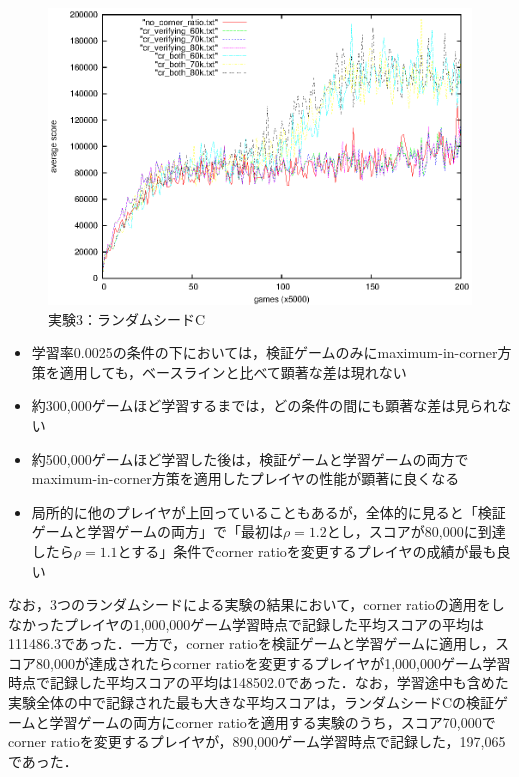 \documentclass{suribt}
\begin{document}
\begin{figure}[tb]
	\begin{center}
	\includegraphics[width=13cm]{figure_013.eps}
	\caption{実験3：ランダムシードC}
	\label{figure_013}
	\end{center}
\end{figure}

\begin{itemize}
\item 学習率0.0025の条件の下においては，検証ゲームのみにmaximum-in-corner方策を適用しても，ベースラインと比べて顕著な差は現れない
\item 約300,000ゲームほど学習するまでは，どの条件の間にも顕著な差は見られない
\item 約500,000ゲームほど学習した後は，検証ゲームと学習ゲームの両方でmaximum-in-corner方策を適用したプレイヤの性能が顕著に良くなる
\item 局所的に他のプレイヤが上回っていることもあるが，全体的に見ると「検証ゲームと学習ゲームの両方」で「最初は${\rho}=1.2$とし，スコアが80,000に到達したら${\rho}=1.1$とする」条件でcorner ratioを変更するプレイヤの成績が最も良い
\end{itemize}

なお，3つのランダムシードによる実験の結果において，corner ratioの適用をしなかったプレイヤの1,000,000ゲーム学習時点で記録した平均スコアの平均は111486.3であった．一方で，corner ratioを検証ゲームと学習ゲームに適用し，スコア80,000が達成されたらcorner ratioを変更するプレイヤが1,000,000ゲーム学習時点で記録した平均スコアの平均は148502.0であった．なお，学習途中も含めた実験全体の中で記録された最も大きな平均スコアは，ランダムシードCの検証ゲームと学習ゲームの両方にcorner ratioを適用する実験のうち，スコア70,000でcorner ratioを変更するプレイヤが，890,000ゲーム学習時点で記録した，197,065であった．
\end{document}
